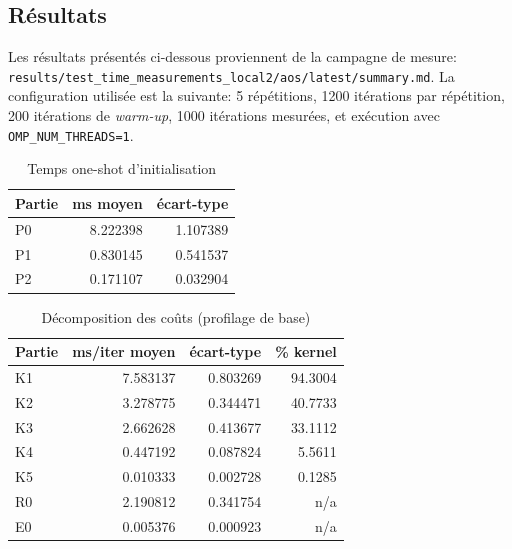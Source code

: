 \subsection{Résultats}

\noindent
Les résultats présentés ci-dessous proviennent de la campagne de mesure:\\
\texttt{results/test\_time\_measurements\_local2/aos/latest/summary.md}. La configuration utilisée
est la suivante: 5 répétitions, 1200 itérations par répétition, 200 itérations de
\textit{warm-up}, 1000 itérations mesurées, et exécution avec \texttt{OMP\_NUM\_THREADS=1}.

\begin{table}[H]
\centering
\caption{Temps one-shot d'initialisation}
\label{tab:results-init}
\begin{tabular}{@{}lrr@{}}
\toprule
\textbf{Partie} & \textbf{ms moyen} & \textbf{écart-type} \\
\midrule
P0 & 8.222398 & 1.107389 \\
P1 & 0.830145 & 0.541537 \\
P2 & 0.171107 & 0.032904 \\
\bottomrule
\end{tabular}
\end{table}

\begin{table}[H]
\centering
\caption{Décomposition des coûts (profilage de base)}
\label{tab:results-decomp}
\begin{tabular}{@{}lrrr@{}}
\toprule
\textbf{Partie} & \textbf{ms/iter moyen} & \textbf{écart-type} & \textbf{\% kernel} \\
\midrule
K1 & 7.583137 & 0.803269 & 94.3004 \\
K2 & 3.278775 & 0.344471 & 40.7733 \\
K3 & 2.662628 & 0.413677 & 33.1112 \\
K4 & 0.447192 & 0.087824 & 5.5611 \\
K5 & 0.010333 & 0.002728 & 0.1285 \\
R0 & 2.190812 & 0.341754 & n/a \\
E0 & 0.005376 & 0.000923 & n/a \\
\bottomrule
\end{tabular}
\end{table}

